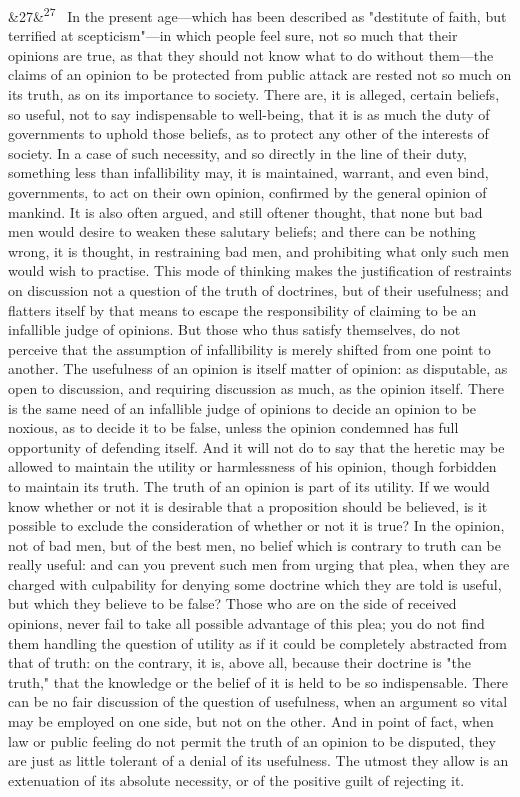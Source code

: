 \documentclass[12pt]{article}
\newcommand{\para}[1][]{\par\noindent\ifx&#1&\else\textsuperscript{\footnotesize #1}~\fi}
\begin{document}
\para[27] In the present age---which has been described as "destitute of faith, but terrified at scepticism"---in which people feel sure, not so much that their opinions are true, as that they should not know what to do without them---the claims of an opinion to be protected from public attack are rested not so much on its truth, as on its importance to society. There are, it is alleged, certain beliefs, so useful, not to say indispensable to well-being, that it is as much the duty of governments to uphold those beliefs, as to protect any other of the interests of society. In a case of such necessity, and so directly in the line of their duty, something less than infallibility may, it is maintained, warrant, and even bind, governments, to act on their own opinion, confirmed by the general opinion of mankind. It is also often argued, and still oftener thought, that none but bad men would desire to weaken these salutary beliefs; and there can be nothing wrong, it is thought, in restraining bad men, and prohibiting what only such men would wish to practise. This mode of thinking makes the justification of restraints on discussion not a question of the truth of doctrines, but of their usefulness; and flatters itself by that means to escape the responsibility of claiming to be an infallible judge of opinions. But those who thus satisfy themselves, do not perceive that the assumption of infallibility is merely shifted from one point to another. The usefulness of an opinion is itself matter of opinion: as disputable, as open to discussion, and requiring discussion as much, as the opinion itself. There is the same need of an infallible judge of opinions to decide an opinion to be noxious, as to decide it to be false, unless the opinion condemned has full opportunity of defending itself. And it will not do to say that the heretic may be allowed to maintain the utility or harmlessness of his opinion, though forbidden to maintain its truth. The truth of an opinion is part of its utility. If we would know whether or not it is desirable that a proposition should be believed, is it possible to exclude the consideration of whether or not it is true? In the opinion, not of bad men, but of the best men, no belief which is contrary to truth can be really useful: and can you prevent such men from urging that plea, when they are charged with culpability for denying some doctrine which they are told is useful, but which they believe to be false? Those who are on the side of received opinions, never fail to take all possible advantage of this plea; you do not find them handling the question of utility as if it could be completely abstracted from that of truth: on the contrary, it is, above all, because their doctrine is "the truth," that the knowledge or the belief of it is held to be so indispensable. There can be no fair discussion of the question of usefulness, when an argument so vital may be employed on one side, but not on the other. And in point of fact, when law or public feeling do not permit the truth of an opinion to be disputed, they are just as little tolerant of a denial of its usefulness. The utmost they allow is an extenuation of its absolute necessity, or of the positive guilt of rejecting it.
\end{document}
